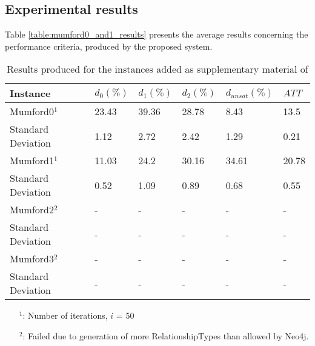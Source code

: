 \subsection{Experimental results}
\label{subsec:scalabilityExperiments_results}


Table \vref{table:mumford0_and1_results} presents the average results concerning the performance criteria, produced by the proposed system.

\begin{table}[H]
    \centering
    \hspace*{-1.0cm}
    \begin{tabular}{|l|l|l|l|l|l|}
        \hline
        \textbf{Instance} & $d_0(\%)$ & $d_1(\%)$ & $d_2(\%)$ & $d_{unsat}(\%)$ & $ATT$\\
        \hline
        Mumford0$^1$ & 23.43 & 39.36 & 28.78 & 8.43 & 13.5\\
        Standard Deviation & 1.12 & 2.72 & 2.42 & 1.29 & 0.21\\
        \hline
        Mumford1$^1$ & 11.03 & 24.2 & 30.16 & 34.61 & 20.78\\
        Standard Deviation & 0.52 & 1.09 & 0.89 & 0.68 & 0.55\\
        \hline
        Mumford2$^2$ & - & - & - & - & - \\
        Standard Deviation & - & - & - & - & -\\
        \hline
        Mumford3$^2$ & - & - & - & - & - \\
        Standard Deviation & - & - & - & - & -\\
        \hline
    \end{tabular}
    \caption{Results produced for the instances added as supplementary material of \citet{mumford13}}
    \tiny
    \begin{itemize}[noitemsep]
    \item[$^1$:] Number of iterations, $i$ = 50
    \item[$^2$:] Failed due to generation of more RelationshipTypes than allowed by Neo4j.
    \end{itemize}
    \label{table:mumford0_and1_results}
\end{table}

